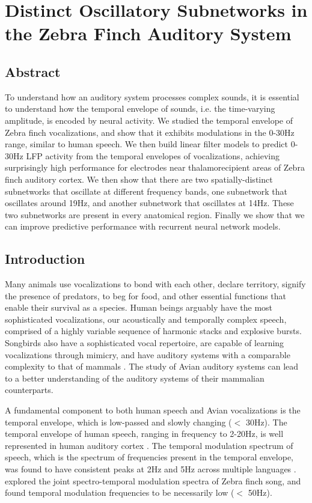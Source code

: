 \chapter{Distinct Oscillatory Subnetworks in the Zebra Finch Auditory System}

\section{Abstract}
To understand how an auditory system processes complex sounds, it is essential to understand how the temporal envelope of sounds, i.e. the time-varying amplitude, is encoded by neural activity. We studied the temporal envelope of Zebra finch vocalizations, and show that it exhibits modulations in the 0-30Hz range, similar to human speech. We then build linear filter models to predict 0-30Hz LFP activity from the temporal envelopes of vocalizations, achieving surprisingly high performance for electrodes near thalamorecipient areas of Zebra finch auditory cortex. We then show that there are two spatially-distinct subnetworks that oscillate at different frequency bands, one subnetwork that oscillates around 19Hz, and another subnetwork that oscillates at 14Hz. These two subnetworks are present in every anatomical region. Finally we show that we can improve predictive performance with recurrent neural network models.

\section{Introduction}

Many animals use vocalizations to bond with each other, declare territory, signify the presence of predators, to beg for food, and other essential functions that enable their survival as a species. Human beings arguably have the most sophisticated vocalizations, our acoustically and temporally complex speech, comprised of a highly variable sequence of harmonic stacks and explosive bursts. Songbirds also have a sophisticated vocal repertoire, are capable of learning vocalizations through mimicry, and have auditory systems with a comparable complexity to that of mammals \cite{Brainard2013}. The study of Avian auditory systems can lead to a better understanding of the auditory systems of their mammalian counterparts.

A fundamental component to both human speech and Avian vocalizations is the temporal envelope, which is low-passed and slowly changing ($<$ 30Hz). The temporal envelope of human speech, ranging in frequency to 2-20Hz, is well represented in human auditory cortex \cite{Aiken2008}. The temporal modulation spectrum of speech, which is the spectrum of frequencies present in the temporal envelope, was found to have consistent peaks at 2Hz and 5Hz across multiple languages \cite{Ding2016}. \cite{Singh2003} explored the joint spectro-temporal modulation spectra of Zebra finch song, and found temporal modulation frequencies to be necessarily low ($<$ 50Hz).

